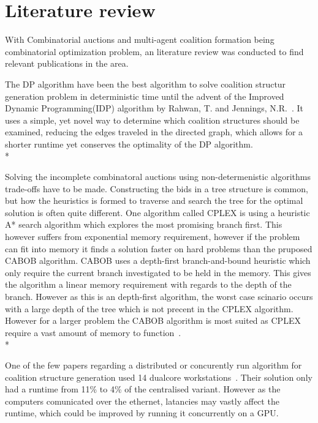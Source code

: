 \documentclass[a4paper, 12pt]{report}
\begin{document}
\section{Literature review}
With Combinatorial auctions and multi-agent coalition formation being combinatorial optimization problem, 
an literature review was conducted to find relevant publications in the area.

The DP algorithm have been the best algorithm to solve coalition structur generation problem in deterministic 
time until the advent of the Improved Dynamic Programming(IDP) algorithm by Rahwan, T. and Jennings, N.R.~\cite{rahwan2008improved}.
It uses a simple, yet novel way to determine which coalition structures should be examined, reducing the 
edges traveled in the directed graph, which allows for a shorter runtime yet conserves the optimality of the DP algorithm.  \\*

Solving the incomplete combinatoral auctions using non-determenistic algorithms trade-offs have to be made.
Constructing the bids in a tree structure is common, but how the heuristics is formed to traverse and search the tree for the optimal solution is often quite different.
One algorithm called CPLEX is using a heuristic A* search algorithm which explores the most promising branch first. 
This however suffers from exponential memory requirement, however if the problem can fit into memory it finds a solution faster on hard problems than the pruposed CABOB algorithm.
CABOB uses a depth-first branch-and-bound heuristic which only require the current branch investigated to be held in the memory.
This gives the algorithm a linear memory requirement with regards to the depth of the branch.
However as this is an depth-first algorithm, the worst case scinario occurs with a large depth of the tree which is not precent in the CPLEX algorithm.
However for a larger problem the CABOB algorithm is most suited as CPLEX require a vast amount of memory to function~\cite{sandholm2002algorithm}.\\*

One of the few papers regarding a distributed or concurently run algorithm for coalition structure generation used 14 dualcore workstations~\cite{michalak2010distributed}.
Their solution only had a runtime from 11\% to 4\% of the centralised variant.
However as the computers comunicated over the ethernet, latancies may vastly affect the runtime, which could be improved by running it concurrently on a GPU.
\end{document}

